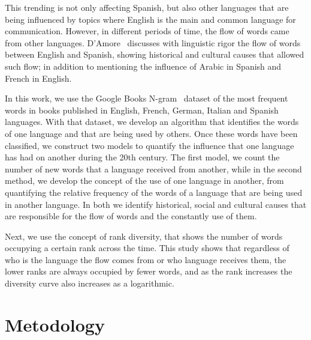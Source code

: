 \documentclass[10pt,letterpaper]{article} %
\begin{document}
This trending is not only affecting  Spanish,  but also other languages that are
being influenced by topics where English is the main and common language for
communication. However, in different periods of time, the flow of words came
from other languages. D’Amore~\cite{Damore_influencia_mutua} discusses with linguistic rigor the
flow of words between English and Spanish,  showing historical  and cultural
causes that allowed such flow; in addition to mentioning the influence of
Arabic in Spanish and French in English. 
 
In this work, we use the Google Books N-gram~\cite{ngramv} dataset of the most
frequent words in books published in  English, French, German, Italian and
Spanish languages.  With that dataset,  we develop an algorithm that identifies
the words of one language  and that are being used by others. Once these words
have been classified, we construct two models to quantify  the influence that
one language has had on another during the 20th century. The first model, we
count the number of new words that a language received from another, while in
the second method, we develop the concept of the use of one language in
another,  from quantifying the relative frequency of  the words of a language
that are being used in another language. In both we identify historical, social
and cultural causes that are responsible for the flow of words and the
constantly use of them.
 
Next, we use the concept of rank diversity,  that shows the number of words
occupying a certain rank across the time. This study shows that  regardless of
who is the language the flow comes from or who language receives them,  the
lower ranks are always occupied by fewer  words, and as the rank increases the
diversity curve also increases as a logarithmic. 
 

\section*{Metodology} %
\end{document}
